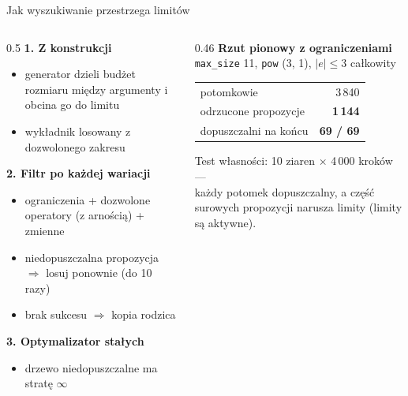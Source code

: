 \documentclass[aspectratio=169,11pt]{beamer}
\begin{document}
\begin{frame}{Jak wyszukiwanie przestrzega limitów}
  \begin{columns}[T]
    \begin{column}{0.5\textwidth}
      \textbf{1. Z konstrukcji}
      \begin{itemize}\small
        \item generator dzieli budżet rozmiaru między argumenty i obcina go do limitu
        \item wykładnik losowany z dozwolonego zakresu
      \end{itemize}
      \textbf{2. Filtr po każdej wariacji}
      \begin{itemize}\small
        \item ograniczenia + dozwolone operatory (z arnością) + zmienne
        \item niedopuszczalna propozycja $\Rightarrow$ losuj ponownie (do 10 razy)
        \item brak sukcesu $\Rightarrow$ kopia rodzica
      \end{itemize}
      \textbf{3. Optymalizator stałych}
      \begin{itemize}\small
        \item drzewo niedopuszczalne ma stratę $\infty$
      \end{itemize}
    \end{column}
    \begin{column}{0.46\textwidth}
      \textbf{Rzut pionowy z ograniczeniami}\\
      {\footnotesize\color{muted}\texttt{max\_size} 11, \texttt{pow} (3, 1), $|e|\le 3$ całkowity}\par\medskip
      \begin{tabular}{@{}lr@{}}
        potomkowie & 3\,840 \\
        odrzucone propozycje & \textbf{1\,144} \\
        dopuszczalni na końcu & \textbf{69 / 69} \\
      \end{tabular}\par\medskip
      {\small Test własności: 10 ziaren $\times$ 4\,000 kroków ---\\ każdy potomek dopuszczalny, a część surowych propozycji narusza limity (limity są aktywne).}
    \end{column}
  \end{columns}
\end{frame}
\end{document}
